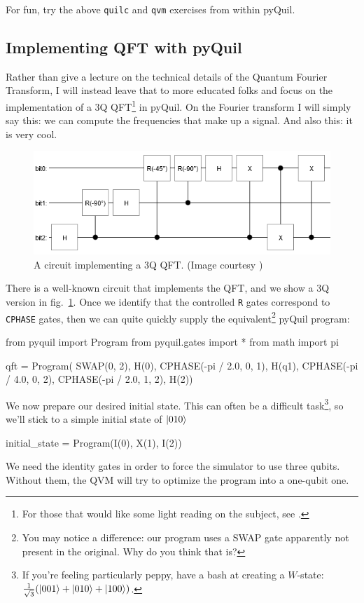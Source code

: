 For fun, try the above \verb|quilc| and \verb|qvm| exercises from within pyQuil.

\subsection{Implementing QFT with pyQuil}

Rather than give a lecture on the technical details of the Quantum Fourier Transform, I will instead leave that to more educated folks and focus on the implementation of a 3Q QFT\footnote{For those that would like some light reading on the subject, see \cite{qft}.} in pyQuil. On the Fourier transform I will simply say this: we can compute the frequencies that make up a signal. And also this: it is very cool.

\begin{figure}
    \centering
    \includegraphics[width=0.8\linewidth]{qft.png}
    \caption{A circuit implementing a 3Q QFT. (Image courtesy \cite{qft})}
    \label{fig:qft}
\end{figure}

There is a well-known circuit that implements the QFT, and we show a 3Q version in fig.~\ref{fig:qft}. Once we identify that the controlled \verb|R| gates correspond to \verb|CPHASE| gates, then we can quite quickly supply the equivalent\footnote{You may notice a difference: our program uses a SWAP gate apparently not present in the original. Why do you think that is?} pyQuil program:
\begin{python}
from pyquil import Program
from pyquil.gates import *
from math import pi

qft = Program(
    SWAP(0, 2),
    H(0),
    CPHASE(-pi / 2.0, 0, 1),
    H(q1),
    CPHASE(-pi / 4.0, 0, 2),
    CPHASE(-pi / 2.0, 1, 2),
    H(2))
\end{python}

We now prepare our desired initial state. This can often be a difficult task\footnote{If you're feeling particularly peppy, have a bash at creating a $W$-state: $\tfrac{1}{\sqrt{3}}(\ket{001}+\ket{010}+\ket{100})$.}, so we'll stick to a simple initial state of $\ket{010}$
\begin{python}
initial_state = Program(I(0), X(1), I(2))
\end{python}
We need the identity gates in order to force the simulator to use three qubits. Without them, the QVM will try to optimize the program into a one-qubit one.

